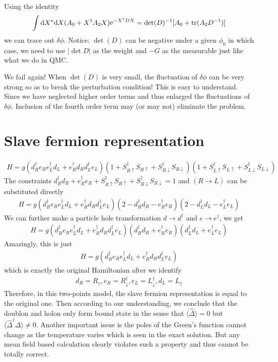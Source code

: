 \documentclass[10pt]{article}
\newcommand{\bea}{\begin{eqnarray}}
\newcommand{\eea}{\end{eqnarray}}
\newcommand{\md}{\mathrm{d}}
\newcommand{\me}{\mathrm{e}}
\begin{document}
Using the identity
\bea \int \md X^* \md X (A_0+X^\dag A_2 X)\me^{-X^\dag D X}=\det(D)^{-1}[A_0+{\rm tr}(A_2D^{-1})] \eea
we can trace out $\delta\phi$. {\color{red} Notice: $\det(D)$ can be negative under a given $\phi_0$ in which case, we need to use $|\det{D}|$ as the weight and $-G$ as the measurable just like what we do in QMC.}

We fail again! When $\det(D)$ is very small, the fluctuation of $\delta\phi$ can be very strong so as to break the perturbation condition! {\color{red} This is easy to understand. Since we have neglected higher order terms and thus enlarged the fluctuations of $\delta\phi$. Inclusion of the fourth order term may (or may not) eliminate the problem.}

\section{Slave fermion representation}
\bea H=g(d_R^\dag e_R e_L^\dag d_L + e_R^\dag d_R d_L^\dag e_L )(1+S_{R\uparrow}^\dag S_{R\uparrow} + S_{R\downarrow}^\dag S_{R\downarrow})(1+S_{L\uparrow}^\dag S_{L\uparrow} + S_{L\downarrow}^\dag S_{L\downarrow}) \eea
The constraints $d_R^\dag d_R+e_R^\dag e_R+S_{R\uparrow}^\dag S_{R\uparrow} + S_{R\downarrow}^\dag S_{R\downarrow}=1$ and $(R\rightarrow L)$ can be substituted directly
\bea H=g(d_R^\dag e_R e_L^\dag d_L + e_R^\dag d_R d_L^\dag e_L )(2-d_R^\dag d_R -e_R^\dag e_R)(2-d_L^\dag d_L - e_L^\dag e_L) \eea
We can further make a particle hole transformation $d\rightarrow d^\dag$ and $e\rightarrow e^\dag$, we get
\bea H=g(d_R^\dag e_R e_L^\dag d_L + e_R^\dag d_R d_L^\dag e_L )(d_R^\dag d_R + e_R^\dag e_R)(d_L^\dag d_L + e_L^\dag e_L) \eea
Amazingly, this is just
\bea H=g(d_R^\dag e_R e_L^\dag d_L + e_R^\dag d_R d_L^\dag e_L ) \eea
which is exactly the original Hamiltonian after we identify 
\bea d_R = R_\uparrow, e_R=R_\downarrow^\dag, e_L=L_\downarrow^\dag, d_L=L_\uparrow \eea
Therefore, in this two-points model, the slave fermion representation is equal to the original one. Then according to our understanding, we conclude that the doublon and holon only form bound state in the sense that $\langle \hat{\Delta} \rangle=0$ but $\langle \hat{\Delta}^\dag\Delta \rangle\ne0$. Another important issue is the poles of the Green's function cannot change as the temperature varies which is seen in the exact solution. But any mean field based calculation clearly violates such a property and thus cannot be totally correct.
\end{document}
